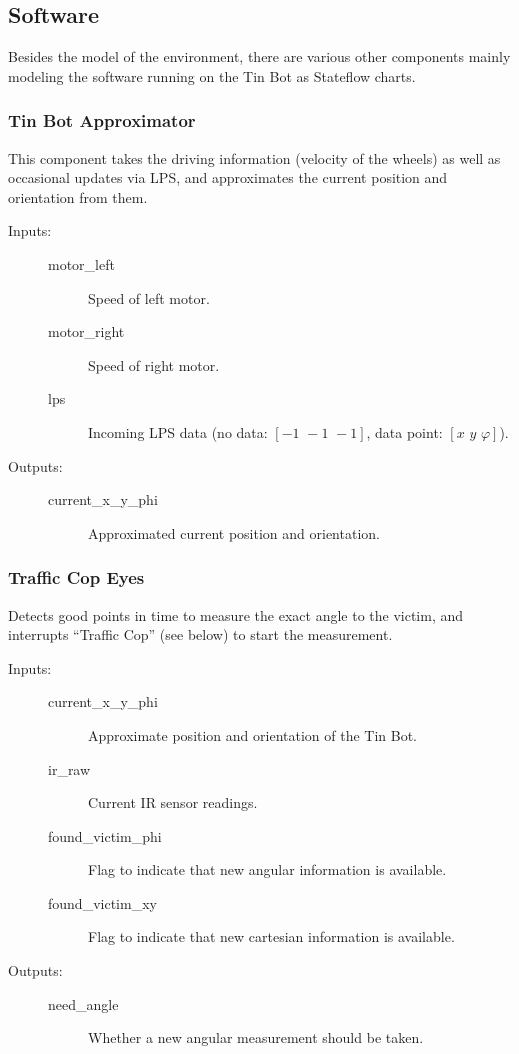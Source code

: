 \documentclass[a4paper,parskip,headheight=38pt]{scrartcl} %
\begin{document}
\subsection{Software}
Besides the model of the environment, there are various other components mainly modeling the software running on the Tin Bot as Stateflow charts.

\subsubsection{Tin Bot Approximator}

This component takes the driving information (velocity of the wheels) as well as occasional updates via LPS, and approximates the current position and orientation from them.

\begin{description}
\item[Inputs:] \hfill
	\begin{description}
	\item[motor\_left] Speed of left motor.
	\item[motor\_right] Speed of right motor.
	\item[lps] Incoming LPS data (no data: $[-1\,\, -1\,\, -1]$, data point: $[x\,\, y\,\, \varphi]$).
	\end{description}
\item[Outputs:] \hfill
	\begin{description}
	\item[current\_x\_y\_phi] Approximated current position and orientation.
	\end{description}
\end{description}

\subsubsection{Traffic Cop Eyes}

Detects good points in time to measure the exact angle to the victim,
and interrupts \enquote{Traffic Cop} (see below) to start the
measurement.

\begin{description}
\item[Inputs:] \hfill
	\begin{description}
	\item[current\_x\_y\_phi] Approximate position and orientation of the Tin Bot. 
	\item[ir\_raw] Current IR sensor readings.
	\item[found\_victim\_phi] Flag to indicate that new angular information is available.
	\item[found\_victim\_xy] Flag to indicate that new cartesian information is available.
	\end{description}
\item[Outputs:] \hfill
	\begin{description}
	\item[need\_angle] Whether a new angular measurement should be taken.
	\end{description}
\end{description}
\end{document}
